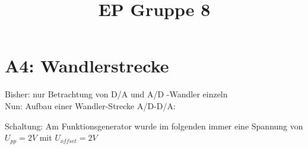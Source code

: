 \documentclass[compress,11pt]{beamer}
\title{EP Gruppe 8}
\begin{document}
\section{A4: Wandlerstrecke}
\begin{frame}
\begin{block}
Bisher: nur Betrachtung von D/A und A/D -Wandler einzeln\\
Nun: Aufbau einer Wandler-Strecke A/D-D/A:
\end{block}
Schaltung:
Am Funktionsgenerator wurde im folgenden immer eine Spannung von $U_{pp} = 2 V$ mit $U_{offset} = 2 V$
\end{frame}
\begin{frame}

\end{frame}
\end{document}
